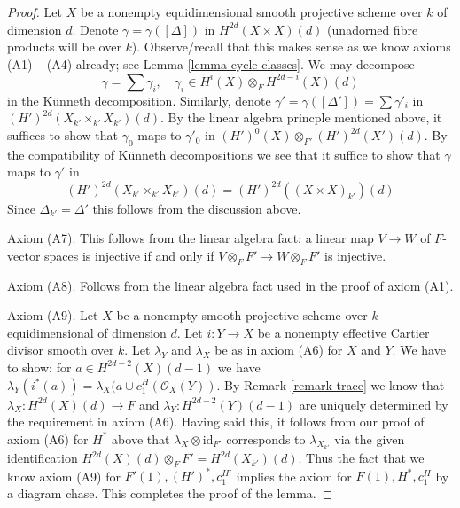 \begin{proof}
\medskip\noindent
Let $X$ be a nonempty equidimensional smooth projective scheme
over $k$ of dimension $d$. Denote $\gamma = \gamma([\Delta])$
in $H^{2d}(X \times X)(d)$ (unadorned fibre products will be over $k$).
Observe/recall that this makes sense as we know axioms (A1) -- (A4) already;
see Lemma \ref{lemma-cycle-classes}. We may decompose
$$
\gamma = \sum \gamma_i, \quad
\gamma_i \in H^i(X) \otimes_F H^{2d - i}(X)(d)
$$
in the K\"unneth decomposition. Similarly, denote
$\gamma' = \gamma([\Delta']) = \sum \gamma'_i$
in $(H')^{2d}(X_{k'} \times_{k'} X_{k'})(d)$.
By the linear algebra princple mentioned above, it suffices
to show that $\gamma_0$ maps to $\gamma'_0$ in
$(H')^0(X) \otimes_{F'} (H')^{2d}(X')(d)$.
By the compatibility of K\"unneth decompositions
we see that it suffice to show that $\gamma$ maps to
$\gamma'$ in
$$
(H')^{2d}(X_{k'} \times_{k'} X_{k'})(d) = (H')^{2d}((X \times X)_{k'})(d)
$$
Since $\Delta_{k'} = \Delta'$ this follows from the discussion above.

\medskip\noindent
Axiom (A7). This follows from the linear algebra fact: a
linear map $V \to W$ of $F$-vector spaces is injective
if and only if $V \otimes_F F' \to W \otimes_F F'$ is injective.

\medskip\noindent
Axiom (A8). Follows from the linear algebra fact used in
the proof of axiom (A1).

\medskip\noindent
Axiom (A9). Let $X$ be a nonempty smooth projective scheme over $k$
equidimensional of dimension $d$. Let $i : Y \to X$ be a nonempty
effective Cartier divisor smooth over $k$.
Let $\lambda_Y$ and $\lambda_X$ be as in axiom (A6) for $X$ and $Y$.
We have to show: for $a \in H^{2d - 2}(X)(d - 1)$
we have $\lambda_Y(i^*(a)) = \lambda_X(a \cup c_1^H(\mathcal{O}_X(Y))$.
By Remark \ref{remark-trace}
we know that $\lambda_X : H^{2d}(X)(d) \to F$ and
$\lambda_Y : H^{2d - 2}(Y)(d - 1)$ are uniquely
determined by the requirement in axiom (A6).
Having said this, it follows from our proof of axiom (A6) for $H^*$ above
that $\lambda_X \otimes \text{id}_{F'}$ corresponds to $\lambda_{X_{k'}}$
via the given identification $H^{2d}(X)(d) \otimes_F F' = H^{2d}(X_{k'})(d)$.
Thus the fact that we know axiom (A9) for $F'(1), (H')^*, c_1^{H'}$
implies the axiom for $F(1), H^*, c_1^H$ by a diagram chase.
This completes the proof of the lemma.
\end{proof}





















